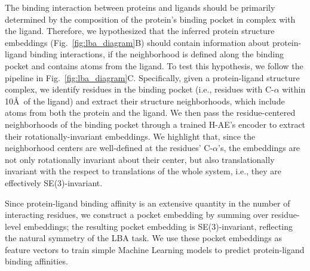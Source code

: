 \begin{table}[t]
\begin{center}
{
}
\end{center}
\label{table:lba_results}
\end{table}




  The binding interaction
between proteins and ligands should be primarily determined  by the composition of the protein's
binding pocket in complex with the ligand. Therefore, we hypothesized that the inferred protein
structure  embeddings  (Fig.~\ref{fig:lba_diagram}B) should contain information about
protein-ligand binding interactions, if the neighborhood is defined along the binding pocket and
contains atoms from the ligand. To test this hypothesis, we  follow the pipeline in
Fig.~\ref{fig:lba_diagram}C. Specifically,  given a protein-ligand structure complex, we identify
residues in the binding pocket (i.e., residues with C-$\alpha$ within 10\AA\, of the ligand) and
extract their structure neighborhoods, which include atoms from both the protein and the ligand. We
then pass the residue-centered neighborhoods of the binding pocket through a trained H-AE's encoder
to extract their rotationally-invariant embeddings. We highlight that, since the neighborhood
centers are well-defined at the residues' C-$\alpha$'s, the embeddings are not only rotationally
invariant about their center, but also translationally invariant with the respect to translations
of the whole system, i.e., they are effectively SE(3)-invariant. 

Since protein-ligand binding affinity is an extensive quantity in the number of interacting
residues, we construct a pocket embedding by summing over residue-level embeddings; the resulting
pocket embedding is SE(3)-invariant, reflecting the natural symmetry of the LBA task. We use these
pocket embeddings as feature vectors to train simple Machine Learning models to predict
protein-ligand binding affinities. 


